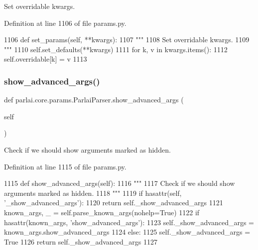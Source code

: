 \begin{DoxyVerb}Set overridable kwargs.
\end{DoxyVerb}
 

Definition at line 1106 of file params.\+py.


\begin{DoxyCode}
1106     \textcolor{keyword}{def }set\_params(self, **kwargs):
1107         \textcolor{stringliteral}{"""}
1108 \textcolor{stringliteral}{        Set overridable kwargs.}
1109 \textcolor{stringliteral}{        """}
1110         self.set\_defaults(**kwargs)
1111         \textcolor{keywordflow}{for} k, v \textcolor{keywordflow}{in} kwargs.items():
1112             self.overridable[k] = v
1113 
\end{DoxyCode}
\mbox{\label{classparlai_1_1core_1_1params_1_1ParlaiParser_a3a75bdeee002ed5a50706f1a6c9797c8}} 
\subsubsection{\texorpdfstring{show\+\_\+advanced\+\_\+args()}{show\_advanced\_args()}}
{\footnotesize\ttfamily def parlai.\+core.\+params.\+Parlai\+Parser.\+show\+\_\+advanced\+\_\+args (\begin{DoxyParamCaption}\item[{}]{self }\end{DoxyParamCaption})}

\begin{DoxyVerb}Check if we should show arguments marked as hidden.
\end{DoxyVerb}
 

Definition at line 1115 of file params.\+py.


\begin{DoxyCode}
1115     \textcolor{keyword}{def }show\_advanced\_args(self):
1116         \textcolor{stringliteral}{"""}
1117 \textcolor{stringliteral}{        Check if we should show arguments marked as hidden.}
1118 \textcolor{stringliteral}{        """}
1119         \textcolor{keywordflow}{if} hasattr(self, \textcolor{stringliteral}{'\_show\_advanced\_args'}):
1120             \textcolor{keywordflow}{return} self.\_show\_advanced\_args
1121         known\_args, \_ = self.parse\_known\_args(nohelp=\textcolor{keyword}{True})
1122         \textcolor{keywordflow}{if} hasattr(known\_args, \textcolor{stringliteral}{'show\_advanced\_args'}):
1123             self.\_show\_advanced\_args = known\_args.show\_advanced\_args
1124         \textcolor{keywordflow}{else}:
1125             self.\_show\_advanced\_args = \textcolor{keyword}{True}
1126         \textcolor{keywordflow}{return} self.\_show\_advanced\_args
1127 
\end{DoxyCode}


